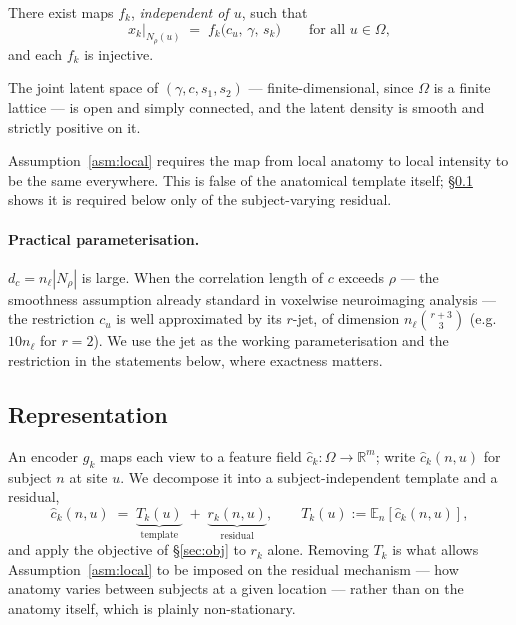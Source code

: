 \begin{assumption}
\label{asm:local}
There exist maps $f_k$, \emph{independent of $u$}, such that
\begin{equation}
  x_k\big|_{N_\rho(u)} \;=\; f_k\big(c_u,\, \gamma,\, s_k\big)
  \qquad \text{for all } u \in \Omega,
\end{equation}
and each $f_k$ is injective.
\end{assumption}

\begin{assumption}[Regularity]
\label{asm:reg}
The joint latent space of $(\gamma, c, s_1, s_2)$ --- finite-dimensional, since $\Omega$ is a
finite lattice --- is open and simply connected, and the latent density is smooth and strictly
positive on it.
\end{assumption}

Assumption~\ref{asm:local} requires the map from local anatomy to local intensity to be the
same everywhere. This is false of the anatomical template itself; \S\ref{sec:repr} shows it is
required below only of the subject-varying residual.

\paragraph{Practical parameterisation.} $d_c = n_\ell|N_\rho|$ is large. When the correlation
length of $c$ exceeds $\rho$ --- the smoothness assumption already standard in voxelwise
neuroimaging analysis --- the restriction $c_u$ is well approximated by its $r$-jet, of
dimension $n_\ell\binom{r+3}{3}$ (e.g.\ $10 n_\ell$ for $r=2$). We use the jet as the working
parameterisation and the restriction in the statements below, where exactness matters.

\subsection{Representation}
\label{sec:repr}

An encoder $g_k$ maps each view to a feature field $\hat c_k : \Omega \to \mathbb{R}^{m}$;
write $\hat c_k(n,u)$ for subject $n$ at site $u$. We decompose it into a subject-independent
template and a residual,
\begin{equation}
  \hat c_k(n,u) \;=\; \underbrace{T_k(u)}_{\text{template}} \;+\;
                      \underbrace{r_k(n,u)}_{\text{residual}},
  \qquad T_k(u) := \mathbb{E}_n\!\left[\hat c_k(n,u)\right],
  \label{eq:decomp}
\end{equation}
and apply the objective of \S\ref{sec:obj} to $r_k$ alone. Removing $T_k$ is what allows
Assumption~\ref{asm:local} to be imposed on the residual mechanism --- how anatomy varies
between subjects at a given location --- rather than on the anatomy itself, which is plainly
non-stationary.

